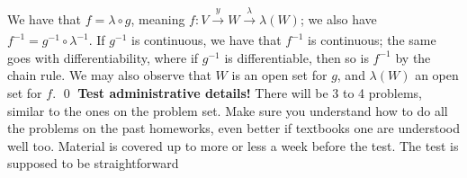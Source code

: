 \noindent We have that $f = \lambda \circ g$, meaning $f : V \xrightarrow[]{y} W \xrightarrow[]{\lambda} \lambda(W)$; we also have $f^{-1} = g^{-1} \circ \lambda^{-1}$. If $g^{-1}$ is continuous, we have that $f^{-1}$ is continuous; the same goes with differentiability, where if $g^{-1}$ is differentiable, then so is $f^{-1}$ by the chain rule. We may also observe that $W$ is an open set for $g$, and $\lambda(W)$ an open set for $f$. \qed
\medskip\newline
\textbf{Test administrative details!} There will be 3 to 4 problems, similar to the ones on the problem set. Make sure you understand how to do all the problems on the past homeworks, even better if textbooks one are understood well too. Material is covered up to more or less a week before the test. The test is supposed to be straightforward